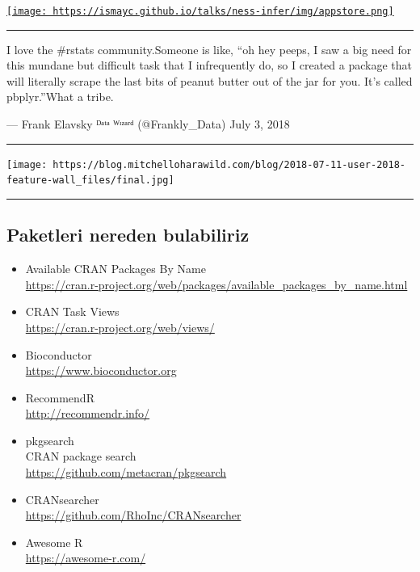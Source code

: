 \documentclass[]{article}
\begin{document}
\href{https://ismayc.github.io/talks/ness-infer/slide_deck.html\#7}{\texttt{[image: https://ismayc.github.io/talks/ness-infer/img/appstore.png]}}

\begin{center}\rule{0.5\linewidth}{\linethickness}\end{center}

I love the \#rstats community.Someone is like, ``oh hey peeps, I saw a
big need for this mundane but difficult task that I infrequently do, so
I created a package that will literally scrape the last bits of peanut
butter out of the jar for you. It's called pbplyr.''What a tribe.

--- Frank Elavsky ᴰᵃᵗᵃ ᵂᶦᶻᵃʳᵈ (@Frankly\_Data) July 3, 2018

\begin{center}\rule{0.5\linewidth}{\linethickness}\end{center}

\texttt{[image: https://blog.mitchelloharawild.com/blog/2018-07-11-user-2018-feature-wall\_files/final.jpg]}

\begin{center}\rule{0.5\linewidth}{\linethickness}\end{center}

\hypertarget{paketleri-nereden-bulabiliriz}{%
\subsection{Paketleri nereden
bulabiliriz}\label{paketleri-nereden-bulabiliriz}}

\begin{itemize}
\item
  Available CRAN Packages By Name\\
  \url{https://cran.r-project.org/web/packages/available_packages_by_name.html}
\item
  CRAN Task Views\\
  \url{https://cran.r-project.org/web/views/}
\item
  Bioconductor\\
  \url{https://www.bioconductor.org}
\item
  RecommendR\\
  \url{http://recommendr.info/}
\item
  pkgsearch\\
  CRAN package search\\
  \url{https://github.com/metacran/pkgsearch}
\item
  CRANsearcher\\
  \url{https://github.com/RhoInc/CRANsearcher}
\item
  Awesome R\\
  \url{https://awesome-r.com/}
\end{itemize}
\end{document}
